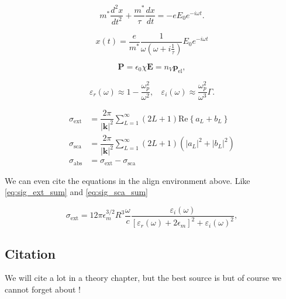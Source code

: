 \begin{equation}\label{eq:permittivity}
	m^*\dfrac{d^2x}{dt^2}+\dfrac{m^*}{\tau}\dfrac{dx}{dt}=-eE_0e^{-i\omega t}.
\end{equation}

\begin{equation}\label{eq:solution_Drude}
	x(t)=\dfrac{e}{m^*}\dfrac{1}{\omega(\omega +i\frac{1}{\tau})}E_0e^{-i\omega t}
\end{equation}

\begin{equation}\label{eq:polarisation}
	\textbf{P}=\epsilon_0\chi \textbf{E}=n_V\textbf{p}_{\text{el}},
\end{equation}

\begin{equation}\label{eq:approx_permittivity}
\varepsilon_r(\omega)\approx 1-\dfrac{\omega_p^2}{\omega^2},~~~~\varepsilon_i(\omega)\approx \dfrac{\omega_p^2}{\omega^3}\Gamma.
\end{equation}

\begin{align}
	\sigma_{\text{ext}}&=\dfrac{2\pi}{|\textbf{k}|^2}\sum\limits_{L=1}^{\infty}(2L+1)\text{Re}\left\lbrace a_L+b_L \right\rbrace\label{eq:sig_ext_sum}\\
	\sigma_{\text{sca}}&=\dfrac{2\pi}{|\textbf{k}|^2}\sum\limits_{L=1}^{\infty}(2L+1)(|a_L|^2+|b_L|^2)\label{eq:sig_sca_sum}\\
	\sigma_{\text{abs}} &=\sigma_{\text{ext}}-\sigma_{\text{sca}}\label{eq:sig_abs}
\end{align}

We can even cite the equations in the align environment above. Like \autoref{eq:sig_ext_sum} and \autoref{eq:sig_sca_sum}

\begin{equation}\label{eq:sig_ext}
	\sigma_{\text{ext}}=12\pi\epsilon_m^{3/2}R^3\dfrac{\omega}{c}\dfrac{\varepsilon_i(\omega)}{\left[\varepsilon_r(\omega)+2\epsilon_m\right]^2+\varepsilon_i(\omega)^2},
\end{equation}

\subsection{Citation}\label{subsec:more_theory}

We will cite a lot in a theory chapter, but the best source is \autocite{gross_festkorperphysik_2018} but of course we cannot forget about \cite{fox_optical_2010,fox_quantum_2006}!

\unpacklipsum[4]{}\lipsumexp
